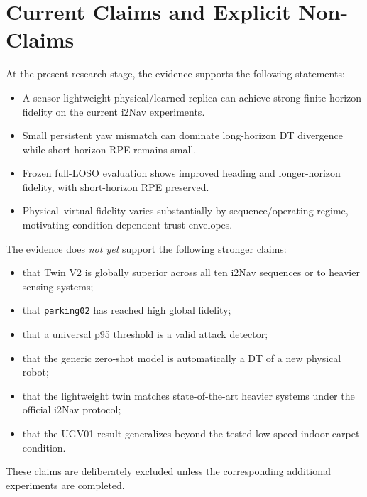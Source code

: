 \documentclass[conference]{IEEEtran}
\begin{document}
\section{Current Claims and Explicit Non-Claims}
At the present research stage, the evidence supports the following statements:
\begin{itemize}
    \item A sensor-lightweight physical/learned replica can achieve strong finite-horizon fidelity on the current i2Nav experiments.
    \item Small persistent yaw mismatch can dominate long-horizon DT divergence while short-horizon RPE remains small.
    \item Frozen full-LOSO evaluation shows improved heading and longer-horizon fidelity, with short-horizon RPE preserved.
    \item Physical--virtual fidelity varies substantially by sequence/operating regime, motivating condition-dependent trust envelopes.
\end{itemize}

The evidence does \emph{not yet} support the following stronger claims:
\begin{itemize}
    \item that Twin V2 is globally superior across all ten i2Nav sequences or to heavier sensing systems;
    \item that \texttt{parking02} has reached high global fidelity;
    \item that a universal p95 threshold is a valid attack detector;
    \item that the generic zero-shot model is automatically a DT of a new physical robot;
    \item that the lightweight twin matches state-of-the-art heavier systems under the official i2Nav protocol;
    \item that the UGV01 result generalizes beyond the tested low-speed indoor carpet condition.
\end{itemize}
These claims are deliberately excluded unless the corresponding additional experiments are completed.
\end{document}
